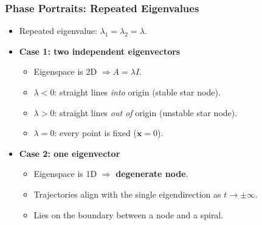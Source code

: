 \documentclass{beamer}
\begin{document}
\begin{frame}
  \frametitle{Phase Portraits: Repeated Eigenvalues}

  \begin{itemize}
    \item Repeated eigenvalue: $\lambda_1=\lambda_2=\lambda$.
    
    \item \textbf{Case 1: two independent eigenvectors}
      \begin{itemize}
        \item Eigenspace is 2D $\Rightarrow A=\lambda I$.
        \item $\lambda<0$: straight lines \emph{into} origin (stable star node).
        \item $\lambda>0$: straight lines \emph{out of} origin (unstable star node).
        \item $\lambda=0$: every point is fixed ($\dot{\mathbf{x}}=0$).
      \end{itemize}

    \item \textbf{Case 2: one eigenvector}
      \begin{itemize}
        \item Eigenspace is 1D $\Rightarrow$ \textbf{degenerate node}.
        \item Trajectories align with the single eigendirection as $t\to\pm\infty$.
        \item Lies on the boundary between a node and a spiral.
      \end{itemize}
  \end{itemize}

\end{frame}




\end{document}
